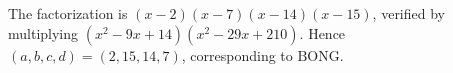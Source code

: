 The factorization is $(x-2)(x-7)(x-14)(x-15)$, verified by multiplying $(x^2-9x+14)(x^2-29x+210)$. Hence $(a,b,c,d)=(2,15,14,7)$, corresponding to $\boxed{\text{BONG}}$.
